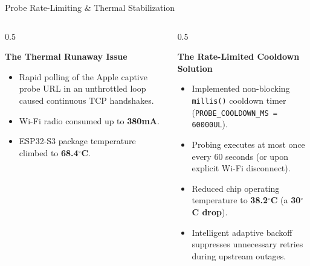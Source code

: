 \documentclass[aspectratio=169, 10pt]{beamer}
\begin{document}
\begin{frame}{Probe Rate-Limiting \& Thermal Stabilization}
    \begin{columns}[T]
        \begin{column}{0.5\textwidth}
            \begin{block}{\textbf{The Thermal Runaway Issue}}
                \begin{itemize}
                    \item Rapid polling of the Apple captive probe URL in an unthrottled loop caused continuous TCP handshakes.
                    \item Wi-Fi radio consumed up to \textbf{380mA}.
                    \item ESP32-S3 package temperature climbed to \textbf{68.4$^\circ$C}.
                \end{itemize}
            \end{block}
        \end{column}
        
        \begin{column}{0.5\textwidth}
            \begin{block}{\textbf{The Rate-Limited Cooldown Solution}}
                \begin{itemize}
                    \item Implemented non-blocking \texttt{millis()} cooldown timer (\texttt{PROBE\_COOLDOWN\_MS = 60000UL}).
                    \item Probing executes at most once every 60 seconds (or upon explicit Wi-Fi disconnect).
                    \item Reduced chip operating temperature to \textbf{38.2$^\circ$C} (a \textbf{30$^\circ$C drop}).
                    \item Intelligent adaptive backoff suppresses unnecessary retries during upstream outages.
                \end{itemize}
            \end{block}
        \end{column}
    \end{columns}
\end{frame}
\end{document}
